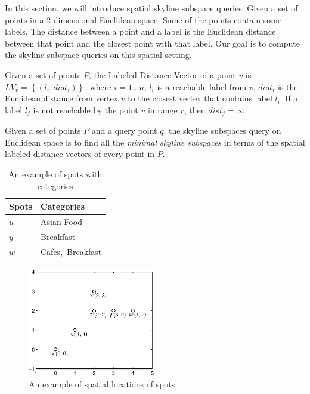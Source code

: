 In this section, we will introduce spatial skyline subspace queries. Given a set of points in a $2$-dimensional Euclidean space. Some of the points contain some labels. The distance between a point and a label is the Euclidean distance between that point and the closest point with that label. Our goal is to compute the skyline subspace queries on this spatial setting.

\begin{definition}
Given a set of points $P$, the Labeled Distance Vector of a point $v$ is $LV_v=\left\{\left(l_i, dist_i\right)\right\}$, where $i = 1 \ldots n$, $l_i$ is a reachable label from $v$, $dist_i$ is the Euclidean distance from vertex $v$ to the closest vertex that contains label $l_i$. If a label $l_j$ is not reachable by the point $v$ in range $r$, then $dist_j = \infty$.
\end{definition}

\begin{definition}
Given a set of points $P$ and a query point $q$, the skyline subspaces query on Euclidean space is to find all the \emph{minimal skyline subspaces} in terms of the spatial labeled distance vectors of every point in $P$.
\end{definition}

\begin{table}[H]
    \centering
    \begin{tabular}{|l|l|}
    \hline
    Spots   & Categories \\ \hline
    $u$     & Asian Food     \\ \hline
    $y$     & Breakfast  \\ \hline
    $w$     & Cafes,~Breakfast   \\ \hline
    \end{tabular}
    \caption{An example of spots with categories}
    \label{tab:spot_category} 
\end{table}


\begin{figure}[H]
    \centering
    \includegraphics[width=0.5\textwidth]{figs/spatial_figure}
    \caption{An example of spatial locations of spots}
    \label{fig:spatial_map}
\end{figure}


